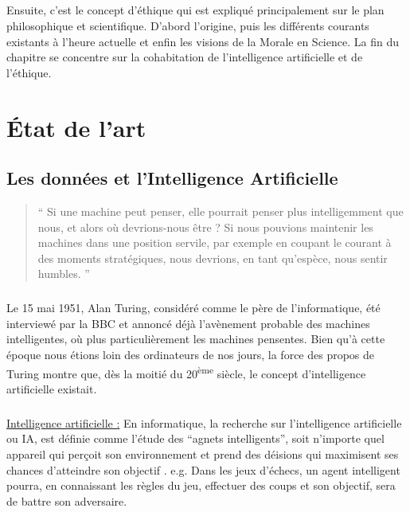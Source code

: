 \documentclass[10pt, french, a4paper]{report}
\begin{document}
\paragraph{}
Ensuite, c’est le concept d’éthique qui est expliqué principalement sur le plan philosophique et scientifique. D’abord l’origine, puis les différents courants existants à l’heure actuelle et enfin les visions de la Morale en Science. La fin du chapitre se concentre sur la cohabitation de l'intelligence artificielle et de l'éthique.

\paragraph{}


\chapter{\uppercase{é}tat de l'art}
\label{chap:etat_art}

\section{Les données et l'Intelligence Artificielle}
\label{sec:ia}

\begin{quotation}
  `` Si une machine peut penser, elle pourrait penser plus intelligemment que nous, et alors où devrions-nous être ? Si nous pouvions maintenir les machines dans une position servile, par exemple en coupant le courant à des moments stratégiques, nous devrions, en tant qu'espèce, nous sentir humbles. ''
\end{quotation}

\paragraph{}
Le 15 mai 1951, Alan Turing, considéré comme le père de l'informatique, été interviewé par la BBC et annoncé déjà l'avènement probable des machines intelligentes, où plus particulièrement les machines pensentes. Bien qu'à cette époque nous étions loin des ordinateurs de nos jours, la force des propos de Turing montre que, dès la moitié du 20\textsuperscript{ème} siècle, le concept d'intelligence artificielle existait.

\paragraph{}
\underline{Intelligence artificielle :} En informatique, la recherche sur l'intelligence artificielle ou IA, est définie comme l'étude des ``agnets intelligents'', soit n'importe quel appareil qui perçoit son environnement et prend des déisions qui maximisent ses chances d'atteindre son objectif \citep{poole_computational_1997}. e.g. Dans les jeux d’échecs, un agent intelligent pourra, en connaissant les règles du jeu, effectuer des coups et son objectif, sera de battre son adversaire.
\end{document}
